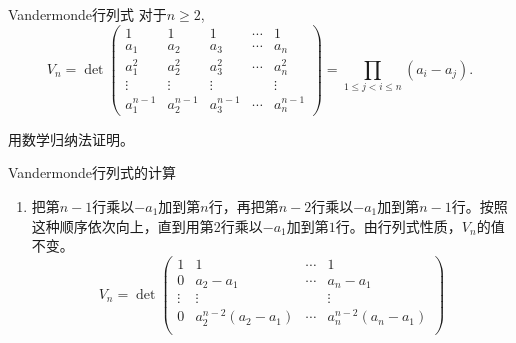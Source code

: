 \begin{frame}

\begin{block}{Vandermonde行列式}
对于$n\geqslant2$,
\[V_n = \det \begin{pmatrix}
1 & 1 & 1 & \cdots & 1 \\
a_1 & a_2 & a_3 & \cdots & a_n \\
a_1^2 & a_2^2 & a_3^2 & \cdots & a_n^2 \\
\vdots & \vdots & \vdots & & \vdots \\
a_1^{n-1} & a_2^{n-1} & a_3^{n-1} & \cdots & a_n^{n-1}
\end{pmatrix} = \prod_{1\leqslant j < i \leqslant n} (a_i - a_j).\]
\end{block}

\vspace{2em}
\pause

用数学归纳法证明。

\end{frame}


\begin{frame}

\begin{block}{Vandermonde行列式的计算}
\begin{enumerate}
\item 把第$n-1$行乘以$-a_1$加到第$n$行，再把第$n-2$行乘以$-a_1$加到第$n-1$行。按照这种顺序依次向上，直到用第$2$行乘以$-a_1$加到第$1$行。由行列式性质，$V_n$的值不变。
\[
V_n = \det \begin{pmatrix}
1 & 1 & \cdots & 1 \\
0 & a_2-a_1 & \cdots & a_n-a_1 \\
\vdots & \vdots & & \vdots \\
0 & a_2^{n-2}(a_2-a_1) & \cdots & a_n^{n-2}(a_n-a_1) \\
\end{pmatrix}
\]
\end{enumerate}
\end{block}

\end{frame}


